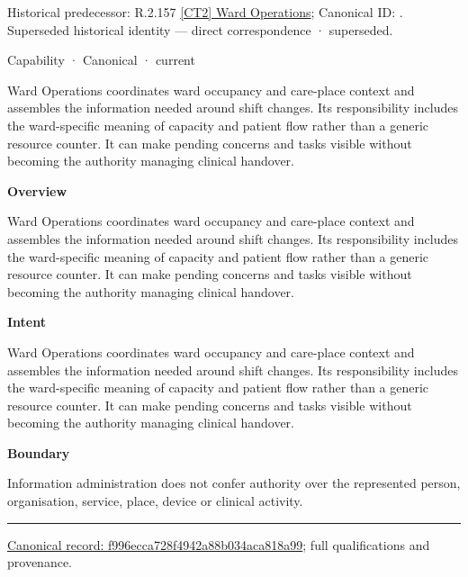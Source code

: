 {\small Historical predecessor: R.2.157 \hyperref[element:bf3d2e3581f24beda20a6a3a3348460e]{[CT2] Ward Operations}; Canonical ID: \texttt{}. Superseded historical identity — direct correspondence · superseded.}\par
\label{element:f996ecca728f4942a88b034aca818a99}
{\small Capability · Canonical · current}\par

Ward Operations coordinates ward occupancy and care-place context and assembles the information needed around shift changes. Its responsibility includes the ward-specific meaning of capacity and patient flow rather than a generic resource counter. It can make pending concerns and tasks visible without becoming the authority managing clinical handover.



\textbf{Overview}



Ward Operations coordinates ward occupancy and care-place context and assembles the information needed around shift changes. Its responsibility includes the ward-specific meaning of capacity and patient flow rather than a generic resource counter. It can make pending concerns and tasks visible without becoming the authority managing clinical handover.



\textbf{Intent}



Ward Operations coordinates ward occupancy and care-place context and assembles the information needed around shift changes. Its responsibility includes the ward-specific meaning of capacity and patient flow rather than a generic resource counter. It can make pending concerns and tasks visible without becoming the authority managing clinical handover.



\textbf{Boundary}



Information administration does not confer authority over the represented person, organisation, service, place, device or clinical activity.



\medskip\hrule\medskip

{\footnotesize \href{../../../../continuum/strategy/capability/f996ecca728f4942a88b034aca818a99.md}{Canonical record: f996ecca728f4942a88b034aca818a99}; full qualifications and provenance.}\par
